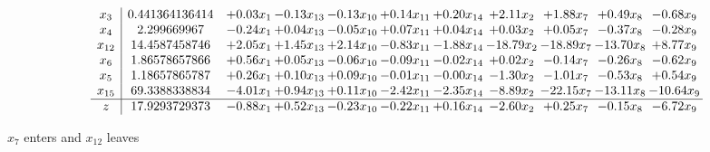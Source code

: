 \documentclass[9pt]{article}
\begin{document}
 \[\begin{array}{c| c c@{\hskip 2pt} c@{\hskip 2pt} c@{\hskip 2pt} c@{\hskip 2pt} c@{\hskip 2pt} c@{\hskip 2pt} c@{\hskip 2pt} c@{\hskip 2pt} c@{\hskip 2pt} }
 x_{3}   &  0.441364136414 & +  0.03 x_{1} & -0.13 x_{13} & -0.13 x_{10} & +  0.14 x_{11} & +  0.20 x_{14} & +  2.11 x_{2} & +  1.88 x_{7} & +  0.49 x_{8} & -0.68 x_{9}\\
 x_{4}   &  2.299669967 & -0.24 x_{1} & +  0.04 x_{13} & -0.05 x_{10} & +  0.07 x_{11} & +  0.04 x_{14} & +  0.03 x_{2} & +  0.05 x_{7} & -0.37 x_{8} & -0.28 x_{9}\\
 x_{12}   &  14.4587458746 & +  2.05 x_{1} & +  1.45 x_{13} & +  2.14 x_{10} & -0.83 x_{11} & -1.88 x_{14} & -18.79 x_{2} & -18.89 x_{7} & -13.70 x_{8} & +  8.77 x_{9}\\
 x_{6}   &  1.86578657866 & +  0.56 x_{1} & +  0.05 x_{13} & -0.06 x_{10} & -0.09 x_{11} & -0.02 x_{14} & +  0.02 x_{2} & -0.14 x_{7} & -0.26 x_{8} & -0.62 x_{9}\\
 x_{5}   &  1.18657865787 & +  0.26 x_{1} & +  0.10 x_{13} & +  0.09 x_{10} & -0.01 x_{11} & -0.00 x_{14} & -1.30 x_{2} & -1.01 x_{7} & -0.53 x_{8} & +  0.54 x_{9}\\
 x_{15}   &  69.3388338834 & -4.01 x_{1} & +  0.94 x_{13} & +  0.11 x_{10} & -2.42 x_{11} & -2.35 x_{14} & -8.89 x_{2} & -22.15 x_{7} & -13.11 x_{8} & -10.64 x_{9}\\
\hline
z    &  17.9293729373 & -0.88 x_{1} & +  0.52 x_{13} & -0.23 x_{10} & -0.22 x_{11} & +  0.16 x_{14} & -2.60 x_{2} & +  0.25 x_{7} & -0.15 x_{8} & -6.72 x_{9}\\
\end{array}\]


 $ x_{7} $ enters and $ x_{12} $ leaves 
\end{document}
